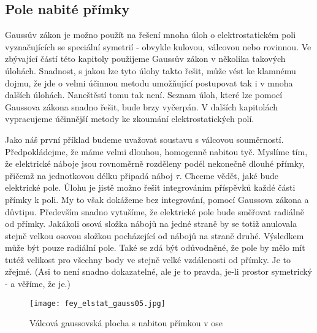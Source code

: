     \subsection{Pole nabité přímky}
      Gaussův zákon je možno použít na řešení mnoha úloh o elektrostatickém poli vyznačujících se speciální 
      symetrií - obvykle kulovou, válcovou nebo rovinnou. Ve zbývající částí této kapitoly použijeme Gaussův 
      zákon v několika takových úlohách. Snadnost, s jakou lze tyto úlohy takto řešit, může vést ke klamnému 
      dojmu, že jde o velmi účinnou metodu umožňující postupovat tak i v mnoha dalších úlohách. Naneštěstí 
      tomu tak není. Seznam úloh, které lze pomocí Gaussova zákona snadno řešit, bude brzy vyčerpán. V 
      dalších kapitolách vypracujeme účinnější metody ke zkoumání elektrostatických polí.
      
      Jako náš první příklad budeme uvažovat soustavu s válcovou souměrností. Předpokládejme, že máme velmi 
      dlouhou, homogenně nabitou tyč. Myslíme tím, že elektrické náboje jsou rovnoměrně rozděleny podél 
      nekonečně dlouhé přímky, přičemž na jednotkovou délku připadá náboj \(\tau\). Chceme vědět, jaké bude 
      elektrické pole. Úlohu je jistě možno řešit integrováním příspěvků každé části přímky k poli. My to 
      však dokážeme bez integrování, pomocí Gaussova zákona a důvtipu. Především snadno vytušíme, že 
      elektrické pole bude směřovat radiálně od přímky. Jakákoli osová složka nábojů na jedné straně by se 
      totiž anulovala stejně velkou osovou složkou pocházející od nábojů na straně druhé. Výsledkem může být 
      pouze radiální pole. Také se zdá být odůvodněné, že pole by mělo mít tutéž velikost pro všechny body ve 
      stejně velké vzdálenosti od přímky. Je to zřejmé. (Asi to není snadno dokazatelné, ale je to pravda, 
      je-li prostor symetrický - a věříme, že je.)
      
      \begin{figure}[ht!] %
        \centering
        \texttt{[image: fey\_elstat\_gauss05.jpg]}
        \caption{Válcová gaussovská plocha s nabitou přímkou v ose}
        \label{fyz:fig_fey_elstat_gauss05}
      \end{figure}  
      
